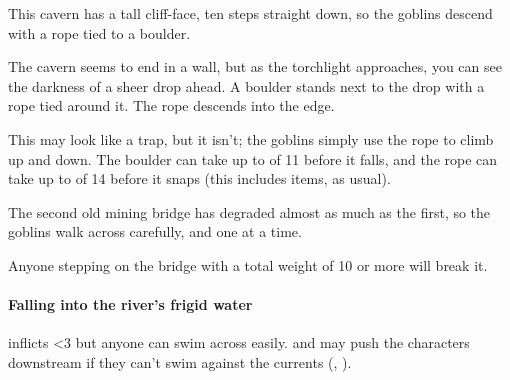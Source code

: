 \begin{multicols}{2}


\begin{exampletext}
  This cavern has a tall cliff-face, ten \glspl{step} straight down, so the goblins descend with a rope tied to a boulder.
\end{exampletext}

\begin{boxtext}
  The cavern seems to end in a wall, but as the torchlight approaches, you can see the darkness of a sheer drop ahead.
  A boulder stands next to the drop with a rope tied around it.
  The rope descends into the edge.
\end{boxtext}

This may look like a trap, but it isn't; the goblins simply use the rope to climb up and down.
The boulder can take up to  of 11 before it falls, and the rope can take up to  of 14 before it snaps (this includes items, as usual).



\begin{exampletext}
  The second old mining bridge has degraded almost as much as the first, so the goblins walk across carefully, and one at a time.
\end{exampletext}

Anyone stepping on the bridge with a total \gls{weight} of 10 or more will break it.

\paragraph{Falling into the river's frigid water}
inflicts 
\ifnum\value{temperature}<3%
  but anyone can swim across easily.
\else%
  and may push the characters downstream if they can't swim against the currents (, \tn[5]).
\fi%





\end{multicols}

